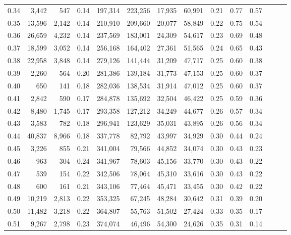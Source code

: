 \begin{tabular}{rrrrrrrrrrrrrr}
0.34 &   3,442 &    547 &  0.14 &  197,314 &  223,256 &  17,935 &  60,991 &  0.21 &  0.77 &      0.57 \\
0.35 &  13,596 &  2,142 &  0.14 &  210,910 &  209,660 &  20,077 &  58,849 &  0.22 &  0.75 &      0.54 \\
0.36 &  26,659 &  4,232 &  0.14 &  237,569 &  183,001 &  24,309 &  54,617 &  0.23 &  0.69 &      0.48 \\
0.37 &  18,599 &  3,052 &  0.14 &  256,168 &  164,402 &  27,361 &  51,565 &  0.24 &  0.65 &      0.43 \\
0.38 &  22,958 &  3,848 &  0.14 &  279,126 &  141,444 &  31,209 &  47,717 &  0.25 &  0.60 &      0.38 \\
0.39 &   2,260 &    564 &  0.20 &  281,386 &  139,184 &  31,773 &  47,153 &  0.25 &  0.60 &      0.37 \\
0.40 &     650 &    141 &  0.18 &  282,036 &  138,534 &  31,914 &  47,012 &  0.25 &  0.60 &      0.37 \\
0.41 &   2,842 &    590 &  0.17 &  284,878 &  135,692 &  32,504 &  46,422 &  0.25 &  0.59 &      0.36 \\
0.42 &   8,480 &  1,745 &  0.17 &  293,358 &  127,212 &  34,249 &  44,677 &  0.26 &  0.57 &      0.34 \\
0.43 &   3,583 &    782 &  0.18 &  296,941 &  123,629 &  35,031 &  43,895 &  0.26 &  0.56 &      0.34 \\
0.44 &  40,837 &  8,966 &  0.18 &  337,778 &   82,792 &  43,997 &  34,929 &  0.30 &  0.44 &      0.24 \\
0.45 &   3,226 &    855 &  0.21 &  341,004 &   79,566 &  44,852 &  34,074 &  0.30 &  0.43 &      0.23 \\
0.46 &     963 &    304 &  0.24 &  341,967 &   78,603 &  45,156 &  33,770 &  0.30 &  0.43 &      0.22 \\
0.47 &     539 &    154 &  0.22 &  342,506 &   78,064 &  45,310 &  33,616 &  0.30 &  0.43 &      0.22 \\
0.48 &     600 &    161 &  0.21 &  343,106 &   77,464 &  45,471 &  33,455 &  0.30 &  0.42 &      0.22 \\
0.49 &  10,219 &  2,813 &  0.22 &  353,325 &   67,245 &  48,284 &  30,642 &  0.31 &  0.39 &      0.20 \\
0.50 &  11,482 &  3,218 &  0.22 &  364,807 &   55,763 &  51,502 &  27,424 &  0.33 &  0.35 &      0.17 \\
0.51 &   9,267 &  2,798 &  0.23 &  374,074 &   46,496 &  54,300 &  24,626 &  0.35 &  0.31 &      0.14 \\

\end{tabular}
